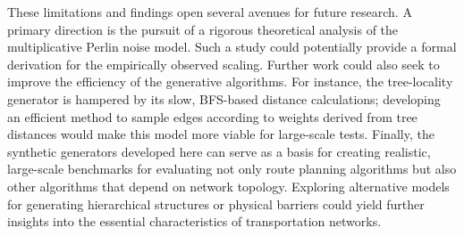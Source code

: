 These limitations and findings open several avenues for future research.
A primary direction is the pursuit of a rigorous theoretical analysis of the multiplicative Perlin noise model.
Such a study could potentially provide a formal derivation for the empirically observed  scaling.
Further work could also seek to improve the efficiency of the generative algorithms.
For instance, the tree-locality generator is hampered by its slow, BFS-based distance calculations; developing an efficient method to sample edges according to weights derived from tree distances would make this model more viable for large-scale tests.
Finally, the synthetic generators developed here can serve as a basis for creating realistic, large-scale benchmarks for evaluating not only route planning algorithms but also other algorithms that depend on network topology.
Exploring alternative models for generating hierarchical structures or physical barriers could yield further insights into the essential characteristics of transportation networks.
